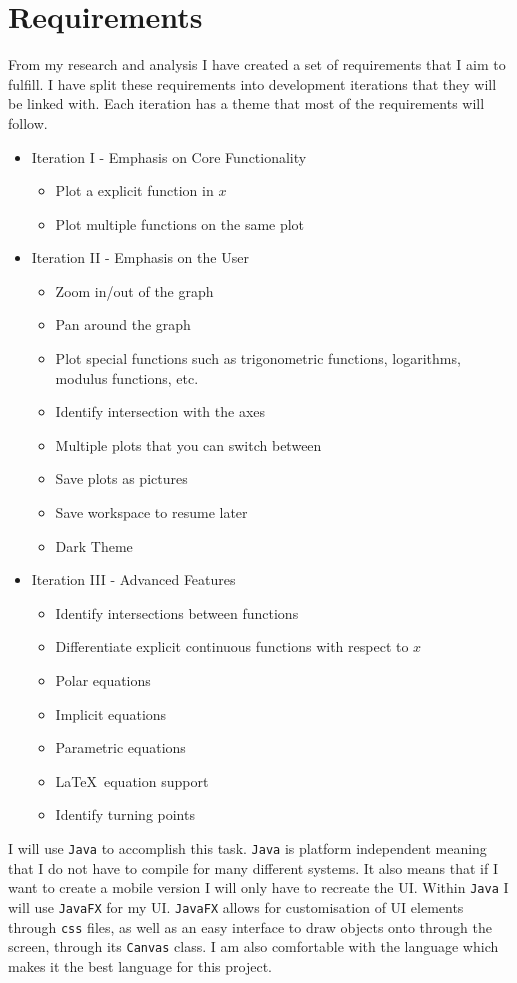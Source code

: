 \documentclass[../../../main.tex]{subfiles}
\begin{document}
\chapter{Requirements}
From my research and analysis I have created a set of requirements that I aim to fulfill. I have split these requirements into development iterations that they will be linked with. Each iteration has a theme that most of the requirements will follow.
\begin{itemize}
	\item Iteration I - Emphasis on Core Functionality
		\begin{itemize}
			\item Plot a explicit function in $x$
			\item Plot multiple functions on the same plot
		\end{itemize}
	\item Iteration II - Emphasis on the User
		\begin{itemize}
			\item Zoom in/out of the graph
			\item Pan around the graph
			\item Plot special functions such as trigonometric functions, logarithms, modulus functions, etc.
			\item Identify intersection with the axes
			\item Multiple plots that you can switch between
			\item Save plots as pictures
			\item Save workspace to resume later
			\item Dark Theme
		\end{itemize}
	\item Iteration III - Advanced Features
		\begin{itemize}
			\item Identify intersections between functions
			\item Differentiate explicit continuous functions with respect to $x$
			\item Polar equations
			\item Implicit equations
			\item Parametric equations
			\item \LaTeX \ equation support
			\item Identify turning points 
		\end{itemize}
\end{itemize}
I will use \texttt{Java} to accomplish this task. \texttt{Java} is platform independent meaning that I do not have to compile for many different systems. It also means that if I want to create a mobile version I will only have to recreate the UI. Within \texttt{Java} I will use \texttt{JavaFX} for my UI. \texttt{JavaFX} allows for customisation of UI elements through \texttt{css} files, as well as an easy interface to draw objects onto through the screen, through its \texttt{Canvas} class.  I am also comfortable with the language which makes it the best language for this project.
\end{document}
